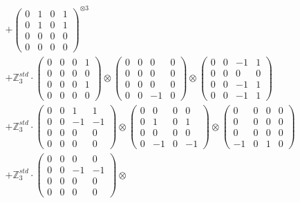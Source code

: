 \documentclass{article}
\begin{document}
{\begin{align}
        &+ \label{Rs16-Rc11-Solution-22-c16} \begin{pmatrix} 0 & 1 & 0 & 1 \\ 0 & 1 & 0 & 1 \\ 0 & 0 & 0 & 0 \\ 0 & 0 & 0 & 0 \end{pmatrix}^{\otimes 3} \\
        &+ \label{Rs16-Rc11-Solution-22-c17} \mathbb{Z}_3^{std} \cdot 
            \begin{pmatrix} 0 & 0 & 0 & 1 \\ 0 & 0 & 0 & 0 \\ 0 & 0 & 0 & 1 \\ 0 & 0 & 0 & 0 \end{pmatrix} \otimes 
            \begin{pmatrix} 0 & 0 & 0 & 0 \\ 0 & 0 & 0 & 0 \\ 0 & 0 & 0 & 0 \\ 0 & 0 & -1 & 0 \end{pmatrix} \otimes 
            \begin{pmatrix} 0 & 0 & -1 & 1 \\ 0 & 0 & 0 & 0 \\ 0 & 0 & -1 & 1 \\ 0 & 0 & -1 & 1 \end{pmatrix} \\ 
        &+ \label{Rs16-Rc11-Solution-22-c18} \mathbb{Z}_3^{std} \cdot 
            \begin{pmatrix} 0 & 0 & 1 & 1 \\ 0 & 0 & -1 & -1 \\ 0 & 0 & 0 & 0 \\ 0 & 0 & 0 & 0 \end{pmatrix} \otimes 
            \begin{pmatrix} 0 & 0 & 0 & 0 \\ 0 & 1 & 0 & 1 \\ 0 & 0 & 0 & 0 \\ 0 & -1 & 0 & -1 \end{pmatrix} \otimes 
            \begin{pmatrix} 0 & 0 & 0 & 0 \\ 0 & 0 & 0 & 0 \\ 0 & 0 & 0 & 0 \\ -1 & 0 & 1 & 0 \end{pmatrix} \\ 
        &+ \label{Rs16-Rc11-Solution-22-c19} \mathbb{Z}_3^{std} \cdot 
            \begin{pmatrix} 0 & 0 & 0 & 0 \\ 0 & 0 & -1 & -1 \\ 0 & 0 & 0 & 0 \\ 0 & 0 & 0 & 0 \end{pmatrix} \otimes 

\end{align}}
\end{document}
